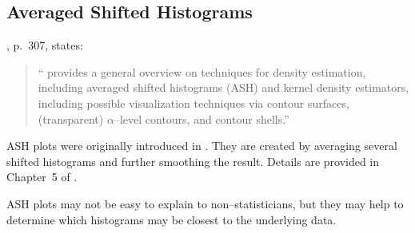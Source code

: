 \documentclass[12pt,letterpaper,final]{article}
\begin{document}
\newpage 


\subsection{Averaged Shifted Histograms}


\cite{Sym2004}, p.~307, states:
\begin{quotation}
``\citet{Sc92} provides a general overview on techniques
for density estimation, including
averaged shifted histograms (ASH)
and kernel density estimators,
including possible visualization techniques via
contour surfaces,
(transparent) $\alpha$--level contours,
and contour shells.''
\end{quotation}

ASH plots were originally introduced in \citet{Sc85}.
They are created by averaging several shifted histograms
and further smoothing the result. Details are provided
in Chapter~5 of \citet{Sc92}.

ASH plots may not be easy to explain to non--statisticians,
but they may help to determine which histograms may be
closest to the underlying data.
\end{document}
